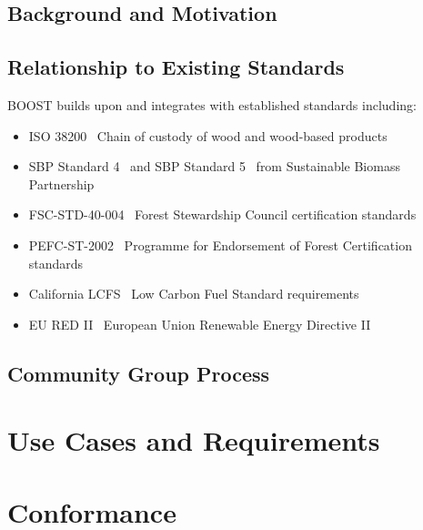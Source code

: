 \documentclass{article}
\begin{document}
\subsection{Background and Motivation}
\label{sec:background-motivation}


\subsection{Relationship to Existing Standards}
\label{sec:existing-standards}

BOOST builds upon and integrates with established standards including:
\begin{itemize}
    \item ISO 38200~\cite{ISO38200} Chain of custody of wood and wood-based products
    \item SBP Standard 4~\cite{SBP-STANDARD-4} and SBP Standard 5~\cite{SBP-STANDARD-5} from Sustainable Biomass Partnership
    \item FSC-STD-40-004~\cite{FSC-STD-40-004} Forest Stewardship Council certification standards
    \item PEFC-ST-2002~\cite{PEFC-ST-2002} Programme for Endorsement of Forest Certification standards
    \item California LCFS~\cite{CA-LCFS} Low Carbon Fuel Standard requirements
    \item EU RED II~\cite{EU-RED-II} European Union Renewable Energy Directive II
\end{itemize}

\subsection{Community Group Process}
\label{sec:community-process}


\section{Use Cases and Requirements}
\label{sec:use-cases}


\section{Conformance}
\label{sec:conformance}


\end{document}
